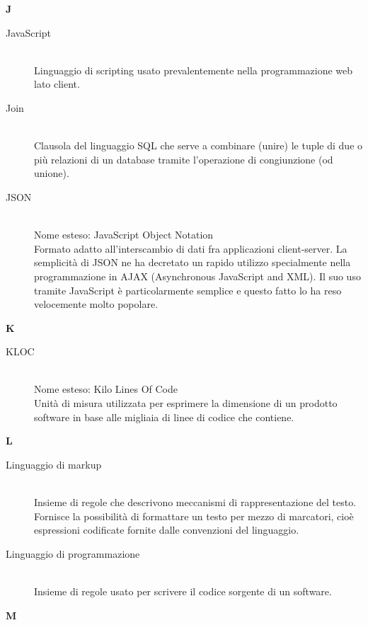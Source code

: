 \newpage 
\begin{center}\textbf{\Huge{J}}\end{center}
\begin{description}\item[JavaScript] \hfill \\
Linguaggio di scripting usato prevalentemente nella programmazione web lato client.
 \item[Join] \hfill \\
Clausola del linguaggio SQL che serve a combinare (unire) le tuple di due o più relazioni di un database tramite l'operazione di congiunzione (od unione).
 \item[JSON] \hfill \\
Nome esteso: JavaScript Object Notation\\ 
Formato adatto all'interscambio di dati fra applicazioni client-server. La semplicità di JSON ne ha decretato un rapido utilizzo specialmente nella programmazione in AJAX (Asynchronous JavaScript and XML). Il suo uso tramite JavaScript è particolarmente semplice e questo fatto lo ha reso velocemente molto popolare.
 \end{description}
\newpage 
\begin{center}\textbf{\Huge{K}}\end{center}
\begin{description}\item[KLOC] \hfill \\
Nome esteso: Kilo Lines Of Code\\ 
Unità di misura utilizzata per esprimere la dimensione di un prodotto software in base alle migliaia di linee di codice che contiene.
 \end{description}
\newpage 
\begin{center}\textbf{\Huge{L}}\end{center}
\begin{description}\item[Linguaggio di markup] \hfill \\
Insieme di regole che descrivono meccanismi di rappresentazione del testo. Fornisce la possibilità di formattare un testo per mezzo di marcatori, cioè espressioni codificate fornite dalle convenzioni del linguaggio.
 \item[Linguaggio di programmazione] \hfill \\
Insieme di regole usato per scrivere il codice sorgente di un software.
 \end{description}
\newpage 
\begin{center}\textbf{\Huge{M}}\end{center}
